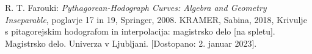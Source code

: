 \documentclass[12pt]{article}
\begin{document}
\begin{thebibliography}{1}
	 R. T. Farouki: \textit{Pythagorean-Hodograph Curves: Algebra and Geometry Inseparable}, poglavje 17 in 19, Springer, 2008.
	 KRAMER, Sabina, 2018, Krivulje s pitagorejskim hodografom in interpolacija: magistrsko delo [na spletu]. Magistrsko delo. Univerza v Ljubljani. [Dostopano: 2. januar 2023].

\end{thebibliography}
\end{document}
